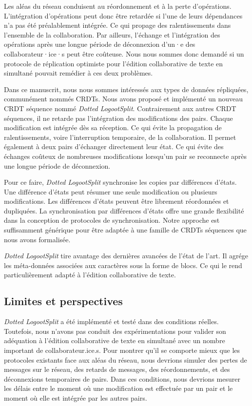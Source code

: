 Les aléas du réseau conduisent au réordonnement et à la perte d'opérations.
L'intégration d'opérations peut donc être retardée si l'une de leurs dépendances n'a pas été préalablement intégrée.
Ce qui propage des ralentissements dans l'ensemble de la collaboration.
Par ailleurs, l'échange et l'intégration des opérations après une longue période de déconnexion d'un·e des collaborateur·ice·s peut être coûteuse.
Nous nous sommes donc demandé si un protocole de réplication optimiste pour l'édition collaborative de texte en simultané pouvait remédier à ces deux problèmes.

Dans ce manuscrit, nous nous sommes intéressés aux types de données répliquées, communément nommés \acp{CRDT}.
Nous avons proposé et implémenté un nouveau \acs{CRDT} séquence nommé \emph{Dotted LogootSplit}.
Contrairement aux autres \acs{CRDT} séquences, il ne retarde pas l'intégration des modifications des pairs.
Chaque modification est intégrée dès sa réception.
Ce qui évite la propagation de ralentissements, voire l'interruption temporaire, de la collaboration.
Il permet également à deux pairs d'échanger directement leur état.
Ce qui évite des échanges coûteux de nombreuses modifications lorsqu'un pair se reconnecte après une longue période de déconnexion.

Pour ce faire, \emph{Dotted LogootSplit} synchronise les copies par différences d'états.
Une différence d'états peut résumer une seule modification ou plusieurs modifications.
Les différences d'états peuvent être librement réordonnées et dupliquées.
La synchronisation par différences d'états offre une grande flexibilité dans la conception de protocoles de synchronisation.
Notre approche est suffisamment générique pour être adaptée à une famille de \acp{CRDT} séquences que nous avons formalisée.

\emph{Dotted LogootSplit} tire avantage des dernières avancées de l'état de l'art.
Il agrége les méta-données associées aux caractères sous la forme de blocs.
Ce qui le rend particulièrement adapté à l'édition collaborative de texte.

\subsection{Limites et perspectives}

\emph{Dotted LogootSplit} a été implémenté et testé dans des conditions réelles.
Toutefois, nous n'avons pas conduit des expérimentations pour valider son adéquation à l'édition collaborative de texte en simultané avec un nombre important de collaborateur.ice.s.
Pour montrer qu'il se comporte mieux que les protocoles existants face aux aléas du réseau, nous devrions simuler des pertes de messages sur le réseau, des retards de messages, des réordonnements, et des déconnexions temporaires de pairs.
Dans ces conditions, nous devrions mesurer les délais entre le moment où une modification est effectuée par un pair et le moment où elle est intégrée par les autres pairs.

